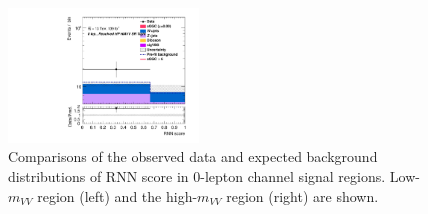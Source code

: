 \begin{figure}[]
    \includegraphics[width=0.45\textwidth]{figures/aQGC/PostFit/Region_distRNN_DSRVBSFidHMtvvjj1200_BMin0_T0_Y6051_incTag1_J2_L0_incJet1_GlobalFit_unconditionnal_mu1log}
      \caption{Comparisons of the observed data and expected background distributions of RNN score in 0-lepton channel signal regions. Low-$m_{VV}$ region (left) and the high-$m_{VV}$ region (right) are shown.}
      \label{fig:postSR0lepaQGC}
\end{figure}

